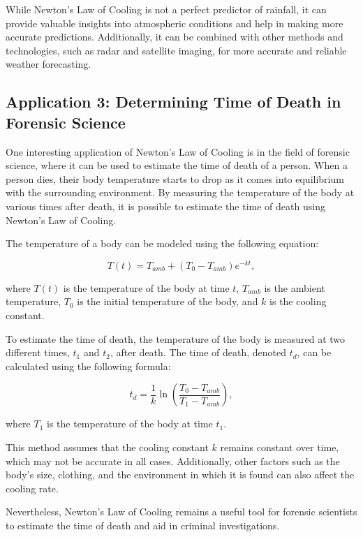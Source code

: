 \documentclass[12pt, a4paper]{article}
\begin{document}
While Newton's Law of Cooling is not a perfect predictor of rainfall, it can provide valuable insights into atmospheric conditions and help in making more accurate predictions. Additionally, it can be combined with other methods and technologies, such as radar and satellite imaging, for more accurate and reliable weather forecasting.

\subsection{Application 3: Determining Time of Death in Forensic Science}

One interesting application of Newton's Law of Cooling is in the field of forensic science, where it can be used to estimate the time of death of a person. When a person dies, their body temperature starts to drop as it comes into equilibrium with the surrounding environment. By measuring the temperature of the body at various times after death, it is possible to estimate the time of death using Newton's Law of Cooling.

The temperature of a body can be modeled using the following equation:

\begin{equation}
T(t) = T_{amb} + (T_0 - T_{amb}) e^{-kt},
\end{equation}

where $T(t)$ is the temperature of the body at time $t$, $T_{amb}$ is the ambient temperature, $T_0$ is the initial temperature of the body, and $k$ is the cooling constant.

To estimate the time of death, the temperature of the body is measured at two different times, $t_1$ and $t_2$, after death. The time of death, denoted $t_d$, can be calculated using the following formula:

\begin{equation}
t_d = \frac{1}{k} \ln \left(\frac{T_0 - T_{amb}}{T_1 - T_{amb}}\right),
\end{equation}

where $T_1$ is the temperature of the body at time $t_1$.

This method assumes that the cooling constant $k$ remains constant over time, which may not be accurate in all cases. Additionally, other factors such as the body's size, clothing, and the environment in which it is found can also affect the cooling rate.

Nevertheless, Newton's Law of Cooling remains a useful tool for forensic scientists to estimate the time of death and aid in criminal investigations.
\end{document}
